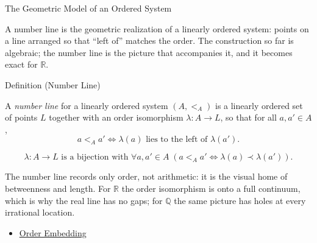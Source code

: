 \begin{topicbox}{The Geometric Model of an Ordered System}
\begin{exposition}
A number line is the geometric realization of a linearly ordered system: points on a line arranged so that ``left of'' matches the order. The construction so far is algebraic; the number line is the picture that accompanies it, and it becomes exact for $\mathbb{R}$.
\end{exposition}
\end{topicbox}
\begin{definitionbox}{Definition (Number Line)}
\begin{definition}
\label{def:number-line}
A \emph{number line} for a linearly ordered system $(A,<_A)$ is a linearly ordered set of points $L$ together with an order isomorphism $\lambda:A\to L$, so that for all $a,a'\in A$,
\[
a<_A a' \Longleftrightarrow \lambda(a) \text{ lies to the left of } \lambda(a').
\]
\end{definition}
\end{definitionbox}
\begin{remark*}
\[
\lambda:A\to L \text{ is a bijection with } \forall a,a'\in A\;(a<_A a'\Leftrightarrow \lambda(a)\prec\lambda(a')).
\]
\end{remark*}
\begin{remark*}[Interpretation]
The number line records only order, not arithmetic: it is the visual home of betweenness and length. For $\mathbb{R}$ the order isomorphism is onto a full continuum, which is why the real line has no gaps; for $\mathbb{Q}$ the same picture has holes at every irrational location.
\end{remark*}
\begin{dependencies}
\begin{itemize}
  \item \hyperref[def:order-embedding]{Order Embedding}
\end{itemize}
\end{dependencies}
